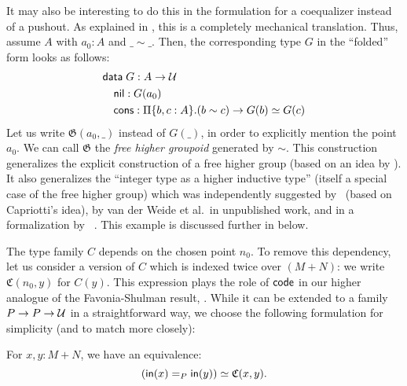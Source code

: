 It may also be interesting to do this in the formulation for a coequalizer
instead of a pushout.
As explained in , this is a completely mechanical translation.
Thus, assume $A$ with $a_0 : A$ and $\_\sim\_$.
Then, the corresponding type $G$ in the ``folded'' form looks as follows:
\begin{equation} \label{eq:free-higher-groupoid-nice}
 \begin{alignedat}{1}
  & \mathsf{data} \; G : A \to \mathcal{U} \\
   & \quad \mathsf{nil} : G(a_0) \\
   & \quad \mathsf{cons} : \Pi \{b,c:A\}. (b \sim c) \to G(b) \simeq G(c)
 \end{alignedat}
\end{equation}
Let us write $\mathfrak G(a_0, \_)$ instead of $G(\_)$, in order to explicitly
mention the point $a_0$.
We can call $\mathfrak G$ the \emph{free higher groupoid} generated by $\sim$.
This construction generalizes the explicit construction of a free higher group
(based on an idea by \citet{kraus_FHG}).
It also generalizes the ``integer type as a higher inductive type''
(itself a special case of the free higher group) which was independently suggested
by~\citet{gun:squid} (based on Capriotti's idea),
by van der Weide et al.\ in unpublished work, and in a formalization by
~\citet{Evan:Squid}.
This example is discussed further in  below.

The type family $C$ depends on the chosen point $n_0$.
To remove this dependency, let us consider a version of $C$ which is indexed
twice over $(M+N)$:
we write $\mathfrak C(n_0, y)$ for $C(y)$.
This expression plays the role of $\mathsf{code}$ in our higher analogue of
the Favonia-Shulman result, .
While it can be extended to a family $P \to P \to \mathcal{U}$ in a straightforward way,
we choose the following formulation for simplicity
(and to match  more closely):

\begin{thm}\label{thm:paths-higher-SvK}
 For $x,y : M+N$, we have an equivalence:
 \begin{equation} \label{eq:thm-higher-svk}
  \left(\mathsf{in}(x) =_P \mathsf{in}(y)\right) \simeq \mathfrak C (x,y).
 \end{equation}
\end{thm}

